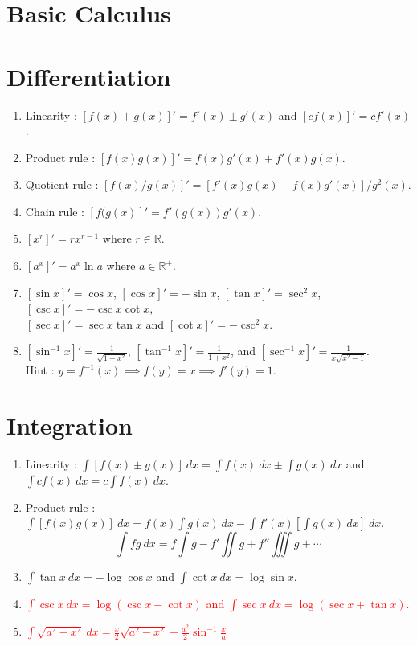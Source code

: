 \section{Basic Calculus}
\section{Differentiation}
\begin{enumerate}
	\item Linearity : $[f(x)+g(x)]' = f'(x) \pm g'(x)$ and $[cf(x)]' = cf'(x)$.
	\item Product rule : $[f(x)g(x)]' = f(x)g'(x) + f'(x)g(x)$.
	\item Quotient rule : $[f(x)/g(x)]' = [f'(x)g(x) - f(x)g'(x)]/g^2(x)$.
	\item Chain rule : $[f(g(x)]' = f'(g(x)) g'(x)$.
	\item $[x^r]' = rx^{r-1}$ where $r \in \mathbb{R}$.
	\item $[a^x]' = a^x \ln a$ where $a \in \mathbb{R}^+$.
	\item $[\sin x]' = \cos x$, $[\cos x]' = -\sin x$, $[\tan x]' = \sec^2 x$, $[\csc x]' = -\csc x \cot x$,\\ $[\sec x]' = \sec x \tan x$ and $[\cot x]' = -\csc^2 x$.
	\item $[\sin^{-1}x]' = \frac{1}{\sqrt{1-x^2}}$, $[\tan^{-1}x]' = \frac{1}{1+x^2}$, and $[\sec^{-1}x]' = \frac{1}{x\sqrt{x^2-1}}$.\\ Hint : $y = f^{-1}(x) \implies f(y) = x \implies f'(y) = 1$.
\end{enumerate}

\section{Integration}
\begin{enumerate}
	\item Linearity : $\int [f(x) \pm g(x)]\ dx = \int f(x)\ dx \pm \int g(x)\ dx$ and $\int cf(x)\ dx = c \int f(x)\ dx$.
	\item Product rule : $\int [f(x)g(x)]\ dx = f(x)\int g(x)\ dx - \int f'(x) \left[\int g(x)\ dx\right]\ dx$.
		{\color{blue}
		$$\int fg\ dx = f\int g - f'\iint g + f''\iiint g + \dotsb $$
		}
	\item $\int \tan x\ dx = -\log \cos x$ and $\int \cot x\ dx = \log \sin x$.
	\item \textcolor{red}{$\int \csc x\ dx = \log (\csc x - \cot x)$ and $\int \sec x\ dx = \log (\sec x + \tan x)$.}
	\item \textcolor{red}{$\int \sqrt{a^2 - x^2}\ dx = \frac{x}{2} \sqrt{a^2 - x^2} + \frac{a^2}{2} \sin^{-1} \frac{x}{a}$}
\end{enumerate}

